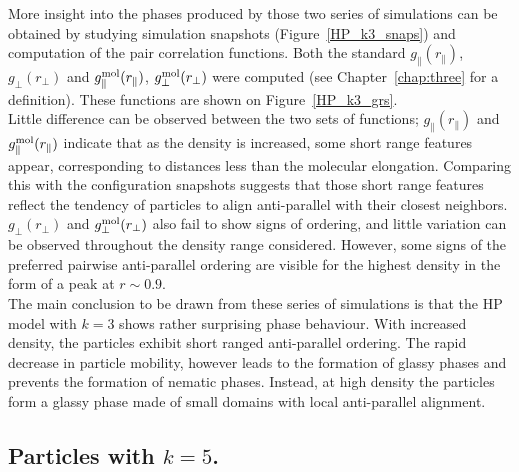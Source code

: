 More insight into the phases produced by those two series of simulations can be obtained by
studying simulation snapshots (\eg Figure~\ref{HP_k3_snaps}) and computation of the pair
correlation functions.
Both the standard $g_\parallel(r_\parallel)$, $g_\perp(r_\perp)$ and 
$g^{\mathrm{mol}}_\parallel(r_\parallel)$, $g^{\mathrm{mol}}_\perp(r_\perp)$ were computed (see
Chapter~\ref{chap:three} for a definition). These functions are shown on 
Figure~\ref{HP_k3_grs}.\\
Little difference can be observed between the two sets of functions; 
$g_\parallel(r_\parallel)$ and $g^{\mathrm{mol}}_\parallel(r_\parallel)$  indicate that as 
the density is increased, some 
short range features appear, corresponding to distances less than the molecular elongation.
Comparing this with the configuration snapshots suggests that those short range features
reflect the tendency of particles to align anti-parallel with their closest neighbors.
$g_\perp(r_\perp)$ and $g^{\mathrm{mol}}_\perp(r_\perp)$ also fail to show signs of ordering, 
and little variation can be
observed throughout the density range considered. However, some signs of the preferred pairwise 
anti-parallel ordering are visible for the highest density in the form of a peak at $r\sim 0.9$.\\ 

The main conclusion to be drawn from these series of simulations is that the HP model with
$k=3$ shows rather surprising phase behaviour. With increased density, the particles exhibit short
ranged anti-parallel ordering. The rapid decrease in particle mobility, however leads to the 
formation of glassy phases and prevents the formation of nematic phases. Instead, at high
density the particles form a glassy phase made of small domains with local anti-parallel 
alignment.


\subsection{Particles with $k=5$.}

